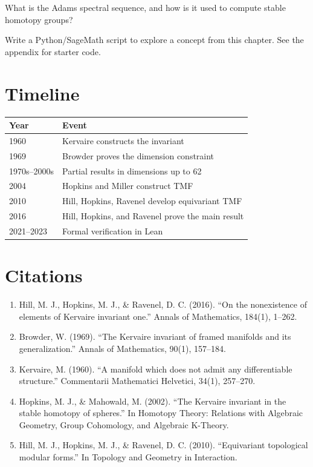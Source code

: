 \begin{exercise}[Challenge]
What is the Adams spectral sequence, and how is it used to compute stable homotopy groups?
\end{exercise}


\begin{exercise}[Computational]
Write a Python/SageMath script to explore a concept from this chapter. See the appendix for starter code.
\end{exercise}

\section{Timeline}

\begin{tabularx}{\linewidth}{lX}
\toprule
\textbf{Year} & \textbf{Event} \\ \midrule
1960 & Kervaire constructs the invariant \cite{kervaire1960} \\ 
1969 & Browder proves the dimension constraint \cite{browder1969} \\ 
1970s--2000s & Partial results in dimensions up to 62 \\ 
2004 & Hopkins and Miller construct TMF \cite{hopkins2004} \\ 
2010 & Hill, Hopkins, Ravenel develop equivariant TMF \cite{hill2010} \\ 
2016 & Hill, Hopkins, and Ravenel prove the main result \cite{hill2016} \\ 
2021--2023 & Formal verification in Lean \\ \bottomrule
\end{tabularx}

\section{Citations}

\begin{enumerate}
\item Hill, M. J., Hopkins, M. J., \& Ravenel, D. C. (2016). ``On the nonexistence of elements of Kervaire invariant one.'' Annals of Mathematics, 184(1), 1--262.
\item Browder, W. (1969). ``The Kervaire invariant of framed manifolds and its generalization.'' Annals of Mathematics, 90(1), 157--184.
\item Kervaire, M. (1960). ``A manifold which does not admit any differentiable structure.'' Commentarii Mathematici Helvetici, 34(1), 257--270.
\item Hopkins, M. J., \& Mahowald, M. (2002). ``The Kervaire invariant in the stable homotopy of spheres.'' In Homotopy Theory: Relations with Algebraic Geometry, Group Cohomology, and Algebraic K-Theory.
\item Hill, M. J., Hopkins, M. J., \& Ravenel, D. C. (2010). ``Equivariant topological modular forms.'' In Topology and Geometry in Interaction.
\end{enumerate}